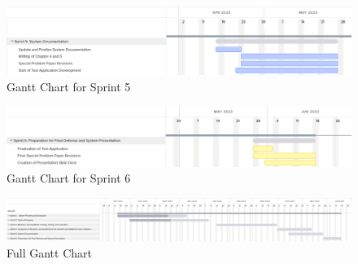 \begin{figure}[ht]
    \centering
    \includegraphics[width=1\textwidth]{./assets/Gantt_Chart_Sprint5.png}
    \caption{Gantt Chart for Sprint 5}
    \label{fig:gantt_chart_sprint5}
\end{figure}

\begin{figure}[ht]
    \centering
    \includegraphics[width=1\textwidth]{./assets/Gantt_Chart_Sprint6.png}
    \caption{Gantt Chart for Sprint 6}
    \label{fig:gantt_chart_sprint6}
\end{figure}

\begin{figure}[ht]
    \centering
    \includegraphics[width=1\textwidth]{./assets/Gantt_Chart_Full.png}
    \caption{Full Gantt Chart}
    \label{fig:gantt_chart_full}
\end{figure}